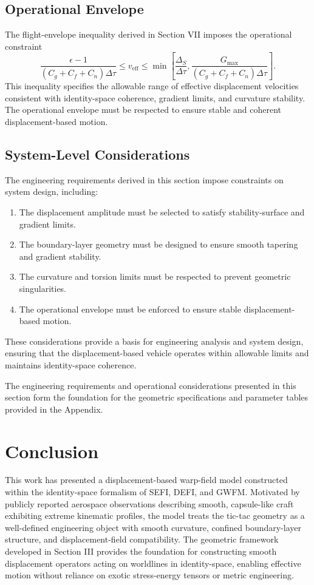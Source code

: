 \documentclass[aip,adv,reprint,floatfix]{revtex4-2}
\begin{document}
\subsection{Operational Envelope}

The flight-envelope inequality derived in Section VII imposes the operational constraint
\begin{equation}
\frac{\epsilon - 1}{(C_g + C_f + C_n)\Delta \tau}
\leq
v_{\mathrm{eff}}
\leq
\min\left[
\frac{\Delta_S}{\Delta \tau},
\frac{G_{\max}}{(C_g + C_f + C_n)\Delta \tau}
\right].
\end{equation}
This inequality specifies the allowable range of effective displacement velocities consistent with identity-space coherence, gradient limits, and curvature stability. The operational envelope must be respected to ensure stable and coherent displacement-based motion.

\subsection{System-Level Considerations}

The engineering requirements derived in this section impose constraints on system design, including:
\begin{enumerate}
\item The displacement amplitude must be selected to satisfy stability-surface and gradient limits.
\item The boundary-layer geometry must be designed to ensure smooth tapering and gradient stability.
\item The curvature and torsion limits must be respected to prevent geometric singularities.
\item The operational envelope must be enforced to ensure stable displacement-based motion.
\end{enumerate}
These considerations provide a basis for engineering analysis and system design, ensuring that the displacement-based vehicle operates within allowable limits and maintains identity-space coherence.

The engineering requirements and operational considerations presented in this section form the foundation for the geometric specifications and parameter tables provided in the Appendix.
\section{Conclusion}

This work has presented a displacement-based warp-field model constructed within the identity-space formalism of SEFI, DEFI, and GWFM. Motivated by publicly reported aerospace observations describing smooth, capsule-like craft exhibiting extreme kinematic profiles, the model treats the tic-tac geometry as a well-defined engineering object with smooth curvature, confined boundary-layer structure, and displacement-field compatibility. The geometric framework developed in Section III provides the foundation for constructing smooth displacement operators acting on worldlines in identity-space, enabling effective motion without reliance on exotic stress-energy tensors or metric engineering.
\end{document}
